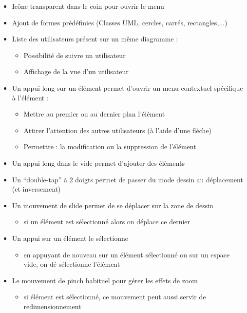 \documentclass[a4paper,11pt]{article}
\begin{document}
\begin{itemize}
\item Icône transparent dans le coin pour ouvrir le menu
\item Ajout de formes prédéfinies (Classes UML, cercles, carrés, rectangles,...)
\item Liste des utilisateurs présent sur un même diagramme :
\begin{itemize}
	\item Possibilité de suivre un utilisateur
	\item Affichage de la vue d’un utilisateur
\end{itemize}

\item Un appui long sur un élément permet d’ouvrir un menu contextuel spécifique à l’élément :
\begin{itemize}
	\item Mettre au premier ou au dernier plan l’élément
	\item Attirer l’attention des autres utilisateurs (à l’aide d’une flèche)
	\item Permettre : la modification ou la suppression de l’élément
\end{itemize}

\item Un appui long dans le vide permet d’ajouter des éléments
\item Un “double-tap” à 2 doigts permet de  passer du mode dessin au déplacement (et inversement)
\item Un mouvement de slide permet de se déplacer sur la zone de dessin

\begin{itemize}
	\item si un élément est sélectionné alors on déplace ce dernier
\end{itemize}

\item Un appui sur un élément le sélectionne
\begin{itemize}
	\item en appuyant de nouveau sur un élément sélectionné ou sur un espace vide, on dé-sélectionne l'élément
\end{itemize}

\item Le mouvement de pinch habituel pour gérer les effets de zoom
\begin{itemize}
	\item si élément est sélectionné, ce mouvement peut aussi servir de redimensionnement 
\end{itemize}

\end{itemize}
\end{document}
